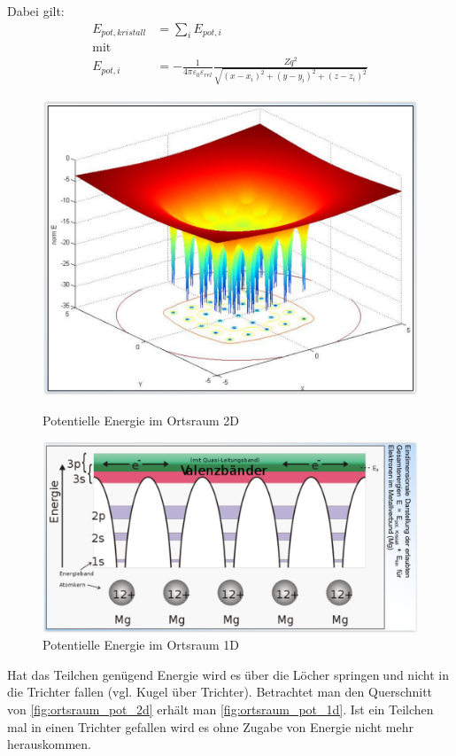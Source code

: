 \documentclass[12pt,a4paper]{report}%
\numberwithin{equation}{section}
\numberwithin{equation}{subsection}
\begin{document}
		Dabei gilt:
		\begin{align}
		  E_{pot,kristall} &= \sum\limits_i E_{pot,i} \\
		  \text{mit} \nonumber \\
		  E_{pot,i} &= - \frac{1}{4 \pi \varepsilon_0 \varepsilon_{rel}} \frac{Z q^2}{\sqrt{(x-x_i)^2+(y-y_i)^2+(z-z_i)^2}}
		\end{align}
		\begin{figure}[H] 
		\centering
		\begin{minipage}{.5\textwidth}
		  \centering
		  \captionsetup{justification=centering}
		  \includegraphics[width=0.7\linewidth]{potentiale_2d.png}
		  \caption{Potentielle Energie im Ortsraum 2D \protect\cite{MIKRO2}}
		  \label{fig:ortsraum_pot_2d}
		\end{minipage}%
		\begin{minipage}{.5\textwidth}
		  \centering
		  \captionsetup{justification=centering}
		  \includegraphics[width=1.1\linewidth]{potentiale_1d.png}
		  \caption{Potentielle Energie im Ortsraum 1D \protect\cite{MIKRO2}}
		  \label{fig:ortsraum_pot_1d}
		\end{minipage}
  \end{figure}
  Hat das Teilchen genügend Energie wird es$\;$\grqq über die Löcher springen\grqq$\;$und nicht in die Trichter fallen (vgl. Kugel über Trichter). Betrachtet man den Querschnitt von \eqref{fig:ortsraum_pot_2d} erhält man \eqref{fig:ortsraum_pot_1d}. Ist ein Teilchen mal in einen Trichter gefallen wird es ohne Zugabe von Energie nicht mehr herauskommen.
  
\end{document}
